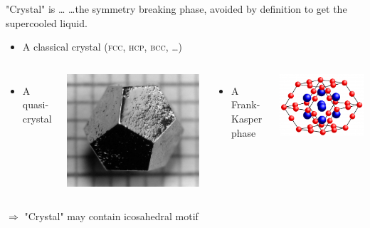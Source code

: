 \documentclass{beamer}
\begin{document}
\begin{frame}{"Crystal" is \ldots}
\ldots the symmetry breaking phase, avoided \alert{by definition} to get the supercooled liquid.
\begin{itemize}
	\item A classical crystal (\textsc{fcc, hcp, bcc}, \ldots)
\end{itemize}
\begin{columns}[T]
	\centering
	\begin{itemize}\item A quasi-crystal\end{itemize}
	\includegraphics[height=0.5\columnwidth]{Ho-Mg-ZnQuasicrystal.jpg}\\
	{\footnotesize\citet{Doye2003}}
	\centering
	\begin{itemize}\item A Frank-Kasper phase\end{itemize}
	\includegraphics[height=0.5\columnwidth]{frankkasper.png}\\
	{\footnotesize\citet{Pedersen2010, Coslovich2011}}
\end{columns}

\bigskip
$\Rightarrow$ "Crystal" may contain icosahedral motif
\end{frame}
\end{document}

